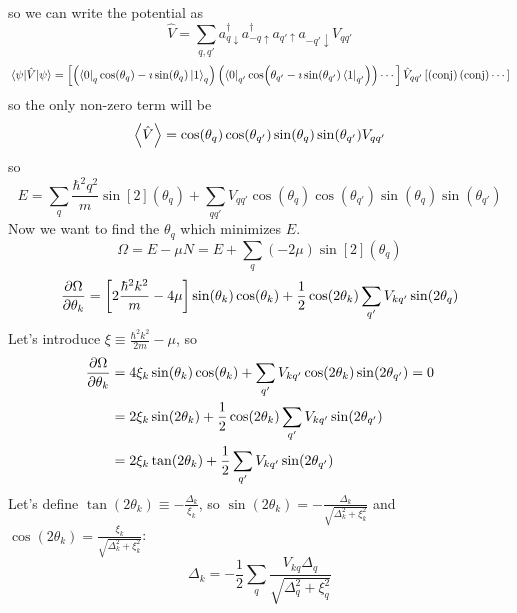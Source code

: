 \documentclass[a4paper,twoside,master.tex]{subfiles}
\begin{document}
so we can write the potential as
\begin{equation}
    \hat{V} = \sum_{q,q'} a^\dagger_{q\downarrow} a^\dagger_{-q\uparrow} a_{q'\uparrow} a_{-q'\downarrow} V_{qq'}
\end{equation}
\begin{equation}
    \mel{\psi}{\hat{V}}{\psi} = \left[ \left(\bra{0}_q \cos(\theta_q) - \imath \sin(\theta_q)\ket{1}_q \right) \left(\bra{0}_{q'} \cos(\theta_{q'} - \imath \sin(\theta_{q'})\bra{1}_{q'}) \right) \cdots \right] \hat{V}_{qq'} \left[ \left( \text{conj} \right) \left( \text{conj} \right) \cdots \right]
\end{equation}
so the only non-zero term will be
\begin{equation}
    \ev{\hat{V}} = \cos(\theta_q) \cos(\theta_{q'}) \sin(\theta_q) \sin(\theta_{q'}) V_{qq'}
\end{equation}
so
\begin{equation}
    E = \sum_q \frac{\hbar^2 q^2}{m} \sin[2](\theta_q) + \sum_{qq'} V_{qq'} \cos(\theta_q) \cos(\theta_{q'}) \sin(\theta_q) \sin(\theta_{q'})
\end{equation}
Now we want to find the $ \theta_q $ which minimizes $ E $.
\begin{equation}
    \Omega = E - \mu N= E + \sum_q (-2 \mu) \sin[2](\theta_q)
\end{equation}
\begin{equation}
    \pdv{\Omega}{\theta_k}= \left[2 \frac{\hbar^2 k^2}{m} - 4 \mu \right] \sin(\theta_k) \cos(\theta_k) + \frac{1}{2} \cos(2 \theta_k) \sum_{q'} V_{kq'} \sin(2 \theta_q)
\end{equation}
Let's introduce $ \xi \equiv \frac{\hbar^2 k^2}{2m} - \mu $, so
\begin{align}
    \pdv{\Omega}{\theta_k} &= 4 \xi_k \sin(\theta_k) \cos(\theta_k) + \sum_{q'} V_{kq'} \cos(2 \theta_k) \sin(2 \theta_{q'}) = 0 \\
    &= 2 \xi_k \sin(2 \theta_k) + \frac{1}{2} \cos(2 \theta_k) \sum_{q'} V_{kq'} \sin(2 \theta_{q'}) \\
    &= 2 \xi_k \tan(2 \theta_k) + \frac{1}{2} \sum_{q'} V_{kq'} \sin(2 \theta_{q'}) \\
\end{align}
Let's define $ \tan(2 \theta_k) \equiv - \frac{\Delta_k}{\xi_k} $, so $ \sin(2 \theta_k) = - \frac{\Delta_k}{\sqrt{\Delta_k^2 + \xi_k^2}} $ and $ \cos(2 \theta_k) = \frac{\xi_k}{\sqrt{\Delta_k^2 + \xi_k^2}} $:
\begin{equation}\label{eq:gap_equation}
    \Delta_k = - \frac{1}{2} \sum_q \frac{V_{kq} \Delta_q}{\sqrt{\Delta_q^2 + \xi_q^2}}\tag{Gap Equation} 
\end{equation}
\end{document}
